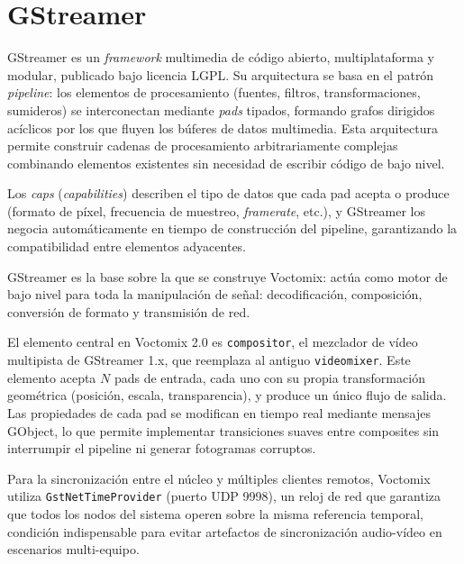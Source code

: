 \section{GStreamer}

GStreamer es un \textit{framework} multimedia de código abierto, multiplataforma y
modular, publicado bajo licencia LGPL. Su arquitectura se basa en el patrón
\textit{pipeline}: los elementos de procesamiento (fuentes, filtros, transformaciones,
sumideros) se interconectan mediante \textit{pads} tipados, formando grafos dirigidos
acíclicos por los que fluyen los búferes de datos multimedia. Esta arquitectura permite
construir cadenas de procesamiento arbitrariamente complejas combinando elementos
existentes sin necesidad de escribir código de bajo nivel.

Los \textit{caps} (\textit{capabilities}) describen el tipo de datos que cada pad
acepta o produce (formato de píxel, frecuencia de muestreo, \textit{framerate}, etc.),
y GStreamer los negocia automáticamente en tiempo de construcción del pipeline,
garantizando la compatibilidad entre elementos adyacentes.

GStreamer es la base sobre la que se construye Voctomix: actúa como motor de bajo
nivel para toda la manipulación de señal: decodificación, composición, conversión de
formato y transmisión de red.

El elemento central en Voctomix 2.0 es \texttt{compositor}, el mezclador de vídeo
multipista de GStreamer 1.x, que reemplaza al antiguo \texttt{videomixer}. Este
elemento acepta $N$ pads de entrada, cada uno con su propia transformación geométrica
(posición, escala, transparencia), y produce un único flujo de salida. Las propiedades
de cada pad se modifican en tiempo real mediante mensajes GObject, lo que permite
implementar transiciones suaves entre composites sin interrumpir el pipeline ni generar
fotogramas corruptos.

Para la sincronización entre el núcleo y múltiples clientes remotos, Voctomix utiliza
\texttt{GstNetTimeProvider} (puerto UDP 9998), un reloj de red que garantiza que todos
los nodos del sistema operen sobre la misma referencia temporal, condición indispensable
para evitar artefactos de sincronización audio-vídeo en escenarios multi-equipo.


